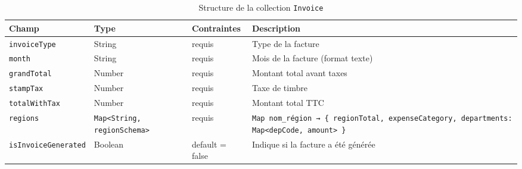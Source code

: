 \documentclass[a4paper,11pt]{report}
\begin{document}
\begin{table}[ht]
  \centering
  \small
  \caption{Structure de la collection \texttt{Invoice}}
  \label{tab:invoice-schema}
  \begin{tabularx}{\textwidth}{l X l X}
    \toprule
    \bf Champ                  & \bf Type                                             & \bf Contraintes           & \bf Description                                                          \\
    \midrule
    \texttt{invoiceType}       & String                                               & requis                    & Type de la facture                                                      \\
    \addlinespace
    \texttt{month}             & String                                               & requis                    & Mois de la facture (format texte)                                       \\
    \addlinespace
    \texttt{grandTotal}        & Number                                               & requis                    & Montant total avant taxes                                               \\
    \addlinespace
    \texttt{stampTax}          & Number                                               & requis                    & Taxe de timbre                                                          \\
    \addlinespace
    \texttt{totalWithTax}      & Number                                               & requis                    & Montant total TTC                                                       \\
    \addlinespace
    \texttt{regions}           & \texttt{Map\textless{}String, regionSchema\textgreater{}} & requis & 
      \texttt{Map nom\_région → \{ regionTotal, expenseCategory, departments: Map\textless{}depCode, amount\textgreater{} \}} \\
    \addlinespace
    \texttt{isInvoiceGenerated}& Boolean                                              & default = false           & Indique si la facture a été générée                                      \\
    \bottomrule
  \end{tabularx}
\end{table}

\vspace{1em}
\end{document}
